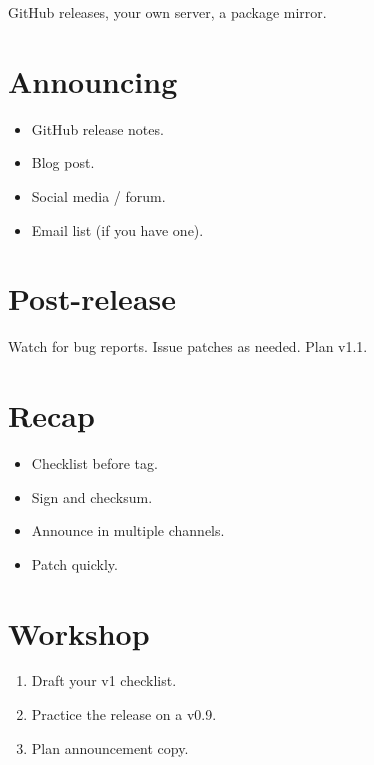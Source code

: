 GitHub releases, your own server, a package mirror.

\section{Announcing}

\begin{itemize}[leftmargin=*]
  \item GitHub release notes.
  \item Blog post.
  \item Social media / forum.
  \item Email list (if you have one).
\end{itemize}

\section{Post-release}

Watch for bug reports. Issue patches as needed. Plan v1.1.

\section{Recap}

\begin{recap}
\begin{itemize}[leftmargin=*]
  \item Checklist before tag.
  \item Sign and checksum.
  \item Announce in multiple channels.
  \item Patch quickly.
\end{itemize}
\end{recap}

\section*{Workshop}

\begin{enumerate}[leftmargin=*]
  \item Draft your v1 checklist.
  \item Practice the release on a v0.9.
  \item Plan announcement copy.
\end{enumerate}
